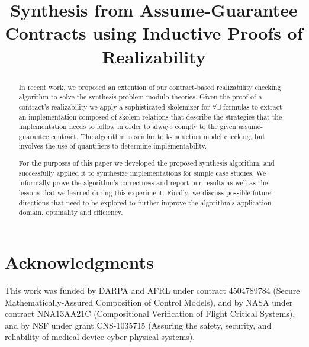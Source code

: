\documentclass[orivec]{llncs}
\begin{document}
\title{Synthesis from Assume-Guarantee Contracts using Inductive Proofs of
Realizability}
\maketitle

\begin{abstract}
In recent work, we proposed an extention of our contract-based
realizability checking algorithm to solve the synthesis problem modulo theories.
Given the proof of a contract's realizability we apply a sophisticated skolemizer for $\forall\exists$ formulas to extract an implementation composed
of skolem relations that describe the strategies that the implementation needs
to follow in order to always comply to the given assume-guarantee contract.
The algorithm is similar to k-induction model checking, but involves the use of 
quantifiers to determine implementability.

For the purposes of this paper we developed the proposed synthesis algorithm,
and successfully applied it to synthesize implementations for simple case
studies. We informally prove the algorithm's correctness and report our results
as well as the lessons that we learned during this experiment. Finally, we
discuss possible future directions that need to be explored to further improve the algorithm's application domain, optimality and efficiency.
\end{abstract}








\section*{Acknowledgments}
This work was funded by DARPA and AFRL under contract 4504789784 (Secure Mathematically-Assured Composition of Control Models), and by NASA under contract NNA13AA21C (Compositional Verification of Flight Critical Systems), and by NSF under grant CNS-1035715 (Assuring the safety, security, and reliability of medical device cyber physical systems).


\end{document}
